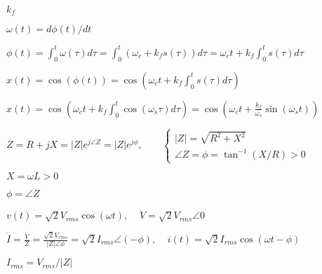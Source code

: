 \documentclass{article}
\def\lthtmlcheckvsize{\ifdim\ht\sizebox<\vsize 
  \ifdim\wd\sizebox<\hsize\expandafter\hfill\fi \expandafter\vfill
  \else\expandafter\vss\fi}%
\begin{document}
{\newpage\clearpage
{}%
$ k_f$%
\lthtmlindisplaymathZ
\lthtmlcheckvsize\clearpage}

{\newpage\clearpage
{}%
$ \omega(t) =d\phi(t)/dt$%
\lthtmlindisplaymathZ
\lthtmlcheckvsize\clearpage}

{\newpage\clearpage
{}%
$\displaystyle \phi(t)=\int_0^t\omega(\tau)d\tau=\int_0^t ( \omega_c+k_f s(\tau)) d\tau
=\omega_c t+k_f \int_0^t s(\tau)d\tau$%
\lthtmlindisplaymathZ
\lthtmlcheckvsize\clearpage}

{\newpage\clearpage
{}%
$\displaystyle x(t)=\cos(\phi(t))=\cos\left(\omega_c t+k_f \int_0^t s(\tau)d\tau\right)$%
\lthtmlindisplaymathZ
\lthtmlcheckvsize\clearpage}

{\newpage\clearpage
{}%
$\displaystyle x(t)=\cos\left(\omega_c t+k_f \int_0^t \cos(\omega_s \tau)d\tau\right)
=\cos\left(\omega_c t+\frac{k_f}{\omega_s} \sin(\omega_s t)\right)$%
\lthtmlindisplaymathZ
\lthtmlcheckvsize\clearpage}

{\newpage\clearpage
{}%
$\displaystyle Z=R+jX=|Z|e^{j\angle Z}=|Z|e^{j\phi},\;\;\;\;\;\;\;
\left\{\begin{array}{ll}|Z|=\sqrt{R^2+X^2}\\\angle Z=\phi=\tan^{-1}(X/R)>0
\end{array}\right.$%
\lthtmlindisplaymathZ
\lthtmlcheckvsize\clearpage}

{\newpage\clearpage
{}%
$ X=\omega L>0$%
\lthtmlindisplaymathZ
\lthtmlcheckvsize\clearpage}

{\newpage\clearpage
{}%
$ \phi=\angle Z$%
\lthtmlindisplaymathZ
\lthtmlcheckvsize\clearpage}

{\newpage\clearpage
{}%
$\displaystyle v(t)=\sqrt{2}V_{rms} \cos(\omega t),\;\;\;\;\dot{V}=\sqrt{2}V_{rms}\angle 0$%
\lthtmlindisplaymathZ
\lthtmlcheckvsize\clearpage}

{\newpage\clearpage
{}%
$\displaystyle \dot{I}=\frac{\dot{V}}{Z}=\frac{\sqrt{2}V_{rms}}{|Z|\angle \phi}
=\sqrt{2}I_{rms}\angle(-\phi),\;\;\;\;i(t)=\sqrt{2}I_{rms} \cos(\omega t-\phi)$%
\lthtmlindisplaymathZ
\lthtmlcheckvsize\clearpage}

{\newpage\clearpage
{}%
$ I_{rms}=V_{rms}/|Z|$%
\lthtmlindisplaymathZ
\lthtmlcheckvsize\clearpage}
\end{document}
